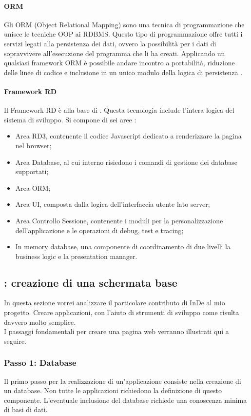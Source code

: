 \paragraph{ORM}\label{ORM}
Gli ORM (Object Relational Mapping) sono una tecnica di programmazione che unisce le tecniche OOP ai RDBMS. Questo tipo di programmazione offre tutti i servizi legati alla persistenza dei dati, ovvero la possibilità per i dati di sopravvivere all'esecuzione del programma che li ha creati. Applicando un qualsiasi framework ORM è possibile andare incontro a portabilità, riduzione delle linee di codice e inclusione in un unico modulo della logica di persistenza \cite{[14]}.

\paragraph{Framework RD}
Il Framework RD è alla base di \inde. Questa tecnologia include l'intera logica del sistema di sviluppo. Si compone di sei aree \cite{[11]}:
\begin{itemize}
	\item Area RD3, contenente il codice Javascript dedicato a renderizzare la pagina nel browser;
	\item Area Database, al cui interno risiedono i comandi di gestione dei database supportati;
	\item Area ORM;
	\item Area UI, composta dalla logica dell'interfaccia utente lato server; 
	\item Area Controllo Sessione, contenente i moduli per la personalizzazione dell'applicazione e le operazioni di debug, test e tracing;
	\item In memory database, una componente di coordinamento di due livelli la business logic e la presentation manager.
\end{itemize}


\subsection{\inde: creazione di una schermata base}
In questa sezione vorrei analizzare il particolare contributo di InDe al mio progetto. Creare applicazioni, con l'aiuto di strumenti di sviluppo come \inde risulta davvero molto semplice.
\\

I passaggi fondamentali per creare una pagina web verranno illustrati qui a seguire.

\subsubsection{Passo 1: Database} 
Il primo passo per la realizzazione di un'applicazione consiste nella creazione di un database. 
Non tutte le applicazioni richiedono la definizione di questo componente. 
L'eventuale inclusione del database richiede una conoscenza minima di basi di dati. 

